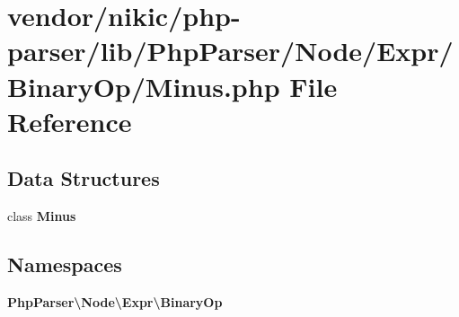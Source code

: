 \section{vendor/nikic/php-\/parser/lib/\+Php\+Parser/\+Node/\+Expr/\+Binary\+Op/\+Minus.php File Reference}
\label{_binary_op_2_minus_8php}
\subsection*{Data Structures}
\begin{DoxyCompactItemize}
\item 
class {\bf Minus}
\end{DoxyCompactItemize}
\subsection*{Namespaces}
\begin{DoxyCompactItemize}
\item 
 {\bf Php\+Parser\textbackslash{}\+Node\textbackslash{}\+Expr\textbackslash{}\+Binary\+Op}
\end{DoxyCompactItemize}
